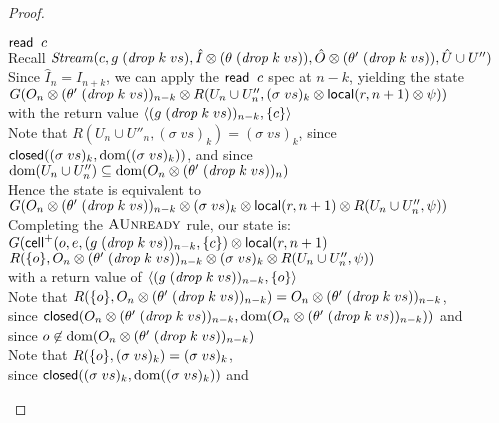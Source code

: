 \begin{proof}
\begin{enumerate}
\begin{tabbedproof}
  \ooooo $\mathsf{read}\;\;c$ \\
  \oooo Recall $\mathit{Stream}(c, g\;(\mathit{drop}\;k\;vs), \hat{I} \otimes (\theta\;(\mathit{drop}\;k\;vs)), \hat{O} \otimes (\theta'\;(\mathit{drop}\;k\;vs)), \hat{U} \cup U'')$ \\
  \oooo Since $\hat{I}_n = I_{n+k}$, we can apply the $\mathsf{read}\;\;c$ spec at $n - k$, yielding the state \\
  \ooooo $G(O_n \otimes (\theta'\;(\mathit{drop}\;k\;vs))_{n-k} \otimes R(U_n \cup U''_n, (\sigma\;vs)_k\otimes \mathsf{local}({r}, {n+1}) \otimes \psi))$ \\ 
  \oooo with the return value $\left<{(g\;(\mathit{drop}\;k\;vs))_{n-k}},{\{{c}\}}\right>$ \\
  \oooo Note that $R(U_n \cup U''_n, (\sigma\;vs)_k) = (\sigma\;vs)_k$, since \\
  \ooooo $\mathsf{closed}({(\sigma\;vs)_k}, {\mbox{dom}({(\sigma\;vs)_k})})$, and since \\
  \ooooo $\mbox{dom}({U_n \cup U''_n}) \subseteq \mbox{dom}({O_n \otimes (\theta'\;(\mathit{drop}\;k\;vs))_n})$ \\ 
  \oooo Hence the state is equivalent to \\
  \ooooo $G(O_n \otimes (\theta'\;(\mathit{drop}\;k\;vs))_{n-k} \otimes (\sigma\;vs)_k\otimes \mathsf{local}({r}, {n+1}) \otimes R(U_n \cup U''_n, \psi))$ \\ 
  \oooo Completing the $\textsc{AUnready}$ rule, our state is: \\
  \ooooo $G(\mathsf{cell}^{+}({o}, {e}, {(g\;(\mathit{drop}\;k\;vs))_{n-k}}, {\{{c}\}}) \otimes \mathsf{local}({r}, {n+1})$ \\
  \oooooo $R(\{{o}\}, O_n \otimes (\theta'\;(\mathit{drop}\;k\;vs))_{n-k} \otimes (\sigma\;vs)_k \otimes R(U_n \cup U''_n, \psi))$ \\ 
  \oooo with a return value of $\left<{(g\;(\mathit{drop}\;k\;vs))_{n-k}},{\{{o}\}}\right>$ \\
  \oooo Note that $R(\{{o}\}, O_n \otimes (\theta'\;(\mathit{drop}\;k\;vs))_{n-k}) = O_n \otimes (\theta'\;(\mathit{drop}\;k\;vs))_{n-k}$, \\
  \ooooo since $\mathsf{closed}({O_n \otimes (\theta'\;(\mathit{drop}\;k\;vs))_{n-k}}, {\mbox{dom}({O_n \otimes (\theta'\;(\mathit{drop}\;k\;vs))_{n-k}})})$ and \\
  \ooooo since $o \not\in \mbox{dom}({O_n \otimes (\theta'\;(\mathit{drop}\;k\;vs))_{n-k}})$ \\
  \oooo Note that $R(\{{o}\}, (\sigma\;vs)_k) = (\sigma\;vs)_k$, \\
  \ooooo since $\mathsf{closed}({(\sigma\;vs)_k}, {\mbox{dom}({(\sigma\;vs)_k})})$ and \\

\end{tabbedproof}
\end{enumerate}
\end{proof}
